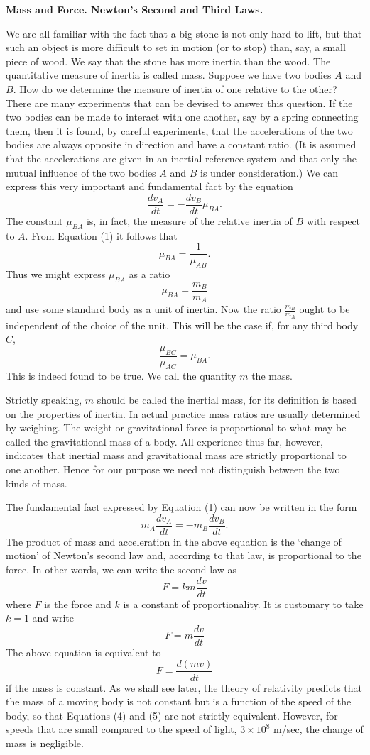 \documentclass[a4paper]{article}
\newcommand{\Eqn}[1]{\begin{equation}#1\end{equation}}
\begin{document}
\textbf{Mass and Force. Newton's Second and Third Laws.}

We are all familiar with the fact that a big stone is not only hard to lift, but that such an object is more difficult to
set in motion (or to stop) than, say, a small piece of wood. We say that the stone has more inertia than the wood. The
quantitative measure of inertia is called mass. Suppose we have two bodies $A$ and $B$. How do we determine the measure of
inertia of one relative to the other? There are many experiments that can be devised to answer this question. If the two
bodies can be made to interact with one another, say by a spring connecting them, then it is found, by careful experiments,
that the accelerations of the two bodies are always opposite in direction and have a constant ratio. (It is assumed that the
accelerations are given in an inertial reference system and that only the mutual influence of the two bodies $A$ and $B$
is under consideration.) We can express this very important and fundamental fact by the equation
\Eqn{\frac{dv_A}{dt}=-\frac{dv_B}{dt}\mu_{BA}.}
The constant $\mu_{BA}$ is, in fact, the measure of the relative inertia of $B$ with respect to $A$. From Equation (1) it
follows that $$\mu_{BA}=\frac{1}{\mu_{AB}}.$$
Thus we might express $\mu_{BA}$ as a ratio
$$\mu_{BA}=\frac{m_B}{m_A}$$
and use some standard body as a unit of inertia. Now the ratio $\frac{m_B}{m_A}$ ought to be independent of the choice of the
unit. This will be the case if, for any third body $C$,
$$\frac{\mu_{BC}}{\mu_{AC}}=\mu_{BA}.$$
This is indeed found to be true. We call the quantity $m$ the mass.

Strictly speaking, $m$ should be called the inertial mass, for its definition is based on the properties of inertia. In
actual practice mass ratios are usually determined by weighing. The weight or gravitational force is proportional to what
may be called the gravitational mass of a body. All experience thus far, however, indicates that inertial mass and gravitational
mass are strictly proportional to one another. Hence for our purpose we need not distinguish between the two kinds of mass.

The fundamental fact expressed by Equation (1) can now be written in the form
\Eqn{m_A\frac{dv_A}{dt}=-m_B\frac{dv_B}{dt}.}
The product of mass and acceleration in the above equation is the `change of motion' of Newton's second law and, according to
that law, is proportional to the force. In other words, we can write the second law as
\Eqn{F=km\frac{dv}{dt}}
where $F$ is the force and $k$ is a constant of proportionality. It is customary to take $k = 1$ and write
\Eqn{F=m\frac{dv}{dt}}
The above equation is equivalent to
\Eqn{F=\frac{d(mv)}{dt}}
if the mass is constant. As we shall see later, the theory of relativity predicts that the mass of a moving body is not constant
but is a function of the speed of the body, so that Equations (4) and (5) are not strictly equivalent. However, for speeds that
are small compared to the speed of light, $3 \times 10^8$ m/sec, the change of mass is negligible.
\end{document}
